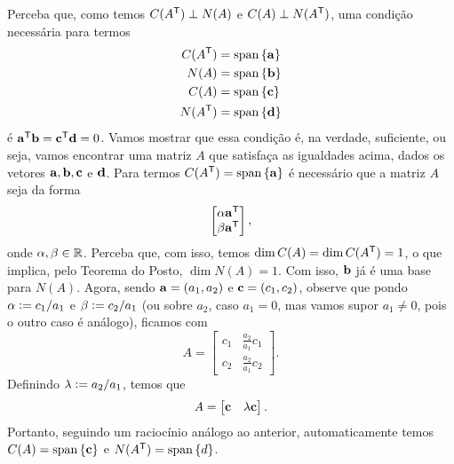 \documentclass[leqno]{article}
\begin{document}
\begin{enumerate}
\begin{enumerate}
\begin{sol}
    Perceba que, como temos \( C ( A^{ \mathsf{T} } ) \perp N ( A ) \) e \( C ( A ) \perp N ( A^{ \mathsf{T} } ) \), uma condição necessária para termos
    \begin{align*}
        C ( A^{ \mathsf{T} } ) &= \operatorname{span} \left\{ \mathbf{a} \right\} \\
        N ( A ) &= \operatorname{span} \left\{ \mathbf{b} \right\} \\
        C ( A ) &= \operatorname{span}  \left\{ \mathbf{c} \right\} \\
        N ( A^{ \mathsf{T} } ) &= \operatorname{span}  \left\{ \mathbf{d} \right\}
    \end{align*}
    é \( \mathbf{a}^{ \mathsf{T} } \mathbf{b} = \mathbf{c}^{ \mathsf{T} } \mathbf{d} = 0 \).
    Vamos mostrar que essa condição é, na verdade, suficiente, ou seja, vamos encontrar uma matriz \( A \) que satisfaça as igualdades acima, dados os vetores \( \mathbf{a}, \mathbf{b}, \mathbf{c} \) e \( \mathbf{d} \).
    Para termos \( C ( A^{ \mathsf{T} } ) = \operatorname{span}  \left\{ \mathbf{a} \right\} \) é necessário que a matriz \( A \) seja da forma
    \begin{equation*}
        \begin{bmatrix}
            \alpha \mathbf{a}^{ \mathsf{T} } \\
            \beta \mathbf{a}^{ \mathsf{T} }
        \end{bmatrix}
    ,\end{equation*}
    onde \( \alpha, \beta \in \mathbb{R} \).
    Perceba que, com isso, temos \( \dim C ( A ) = \dim C ( A^{ \mathsf{T} } ) = 1 \), o que implica, pelo Teorema do Posto, \( \dim N ( A ) = 1 \).
    Com isso, \( \mathbf{b} \) já é uma base para \( N ( A ) \).
    Agora, sendo \( \mathbf{a} = ( a_{ 1 }, a_{ 2 } ) \) e \( \mathbf{c} = ( c_{ 1 }, c_{ 2 } ) \), observe que pondo \( \alpha \vcentcolon= c_{ 1 }/a_{ 1 } \) e \( \beta \vcentcolon= c_{ 2 } / a_{ 1 } \) (ou sobre \( a_{ 2 } \), caso \( a_{ 1 } = 0 \), mas vamos supor \( a_{ 1 } \neq 0 \), pois o outro caso é análogo), ficamos com
    \begin{equation*}
        A =
        \begin{bmatrix}
            c_{ 1 } & \frac{ a_{ 2 } }{ a_{ 1 } } c_{ 1 } \\
            c_{ 2 } & \frac{ a_{ 2 } }{ a_{ 1 } } c_{ 2 }
        \end{bmatrix}
    .\end{equation*}
    Definindo \( \lambda \vcentcolon= a_{ 2 } / a_{ 1 } \), temos que
    \begin{equation*}
        A = \begin{bmatrix}
            \mathbf{c} & \lambda \mathbf{c}
        \end{bmatrix}
    .\end{equation*}
    Portanto, seguindo um raciocínio análogo ao anterior, automaticamente temos \( C ( A ) = \operatorname{span} \left\{ \mathbf{c} \right\} \) e \( N ( A^{ \mathsf{T} } ) = \operatorname{span} \left\{ d \right\} \).


\end{sol}
\end{enumerate}
\end{enumerate}
\end{document}
